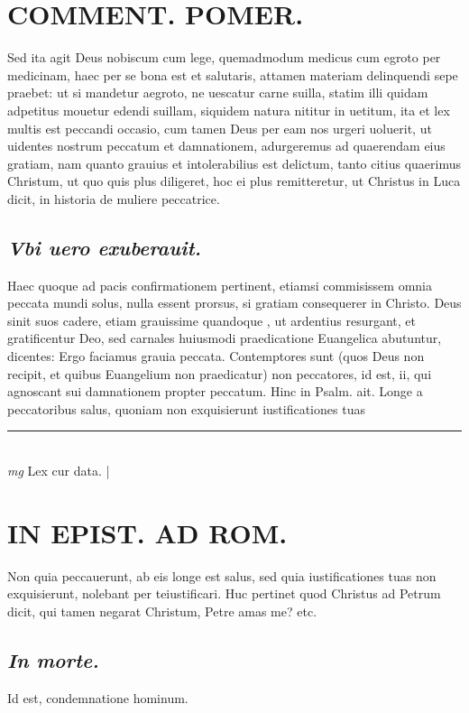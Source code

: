 \documentclass{article}
\begin{document}
\begin{pages}
\section*{COMMENT. POMER.  }\pstart Sed ita agit Deus nobiscum cum lege, quemadmodum medicus cum egroto per medicinam, haec per se bona est et salutaris, attamen materiam delinquendi sepe praebet: ut si mandetur aegroto, ne uescatur carne suilla, statim illi quidam adpetitus mouetur edendi suillam, siquidem natura nititur in uetitum, ita et lex multis est peccandi occasio, cum tamen Deus per eam nos urgeri uoluerit, ut uidentes nostrum peccatum et damnationem, adurgeremus ad quaerendam eius gratiam, nam quanto grauius et intolerabilius est delictum, tanto citius quaerimus Christum, ut quo quis plus diligeret, hoc ei plus remitteretur, ut Christus in Luca dicit, in historia de muliere peccatrice.   \pend
{}
{}
\subsection*{\textit{Vbi uero exuberauit. }}\pstart Haec quoque ad pacis confirmationem pertinent, etiamsi commisissem omnia peccata mundi solus, nulla essent prorsus, si gratiam consequerer in Christo.  Deus sinit suos cadere, etiam grauissime quandoque , ut ardentius resurgant, et gratificentur Deo, sed carnales huiusmodi praedicatione Euangelica abutuntur, dicentes: Ergo faciamus grauia peccata. Contemptores sunt (quos Deus non recipit, et quibus Euangelium non praedicatur) non peccatores, id est, ii, qui agnoscant sui damnationem propter peccatum. Hinc in Psalm. ait. Longe a peccatoribus salus, quoniam non exquisierunt iustificationes tuas\pend
\vspace{0.5cm}\noindent
\vspace{0.2cm}\rule{1cm}{0.2pt}\\ 
\hspace{0.2cm}\textit{mg}
\footnotesize Lex cur data.  
\normalsize| 
\section*{IN EPIST. AD ROM.  }
\marginpar{[ p.57 ]}\pstart Non quia peccauerunt, ab eis longe est salus, sed quia iustificationes tuas non exquisierunt, nolebant per teiustificari. Huc pertinet quod Christus ad Petrum dicit, qui tamen negarat Christum, Petre amas me? etc.   \pend
{}
{}
\subsection*{\textit{In morte. }}\pstart Id est, condemnatione hominum.   \pend
{}
{}

\end{pages}
\end{document}
